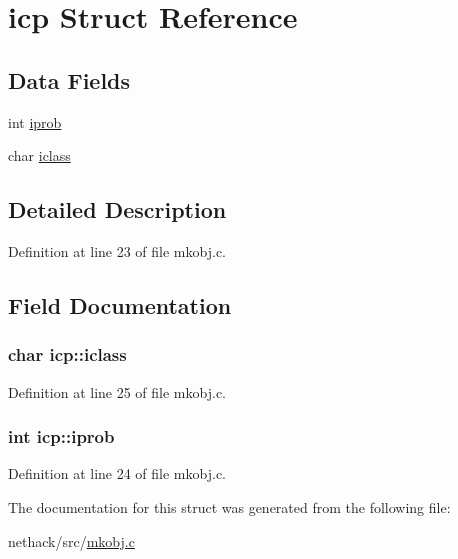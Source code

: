 \hypertarget{structicp}{\section{icp Struct Reference}
\label{structicp}
}
\subsection*{Data Fields}
\begin{DoxyCompactItemize}
\item 
int \hyperlink{structicp_a73d52766861d05dd755b51b976a08203}{iprob}
\item 
char \hyperlink{structicp_ad6592564023c899983953e4e20fc4a4c}{iclass}
\end{DoxyCompactItemize}


\subsection{Detailed Description}


Definition at line 23 of file mkobj.\+c.



\subsection{Field Documentation}
\hypertarget{structicp_ad6592564023c899983953e4e20fc4a4c}{
\subsubsection[{iclass}]{\setlength{\rightskip}{0pt plus 5cm}char icp\+::iclass}}\label{structicp_ad6592564023c899983953e4e20fc4a4c}


Definition at line 25 of file mkobj.\+c.

\hypertarget{structicp_a73d52766861d05dd755b51b976a08203}{
\subsubsection[{iprob}]{\setlength{\rightskip}{0pt plus 5cm}int icp\+::iprob}}\label{structicp_a73d52766861d05dd755b51b976a08203}


Definition at line 24 of file mkobj.\+c.



The documentation for this struct was generated from the following file\+:\begin{DoxyCompactItemize}
\item 
nethack/src/\hyperlink{mkobj_8c}{mkobj.\+c}\end{DoxyCompactItemize}
